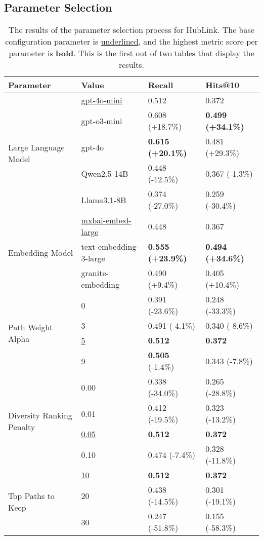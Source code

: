 \subsection{Parameter Selection}

\begin{table}[t]
    \centering
    \begin{tabular}{llll}
        \toprule
        \textbf{Parameter} & \textbf{Value} & \textbf{Recall} & \textbf{Hits@10} \\
        \midrule
        \multirow{5}{*}{Large Language Model} 
            & \underline{gpt-4o-mini} & 0.512 & 0.372 \\
            & gpt-o3-mini & 0.608 (+18.7\%) & \textbf{0.499 (+34.1\%)} \\
            & gpt-4o & \textbf{0.615 (+20.1\%)} & 0.481 (+29.3\%) \\
            & Qwen2.5-14B & 0.448 (-12.5\%) & 0.367 (-1.3\%) \\
            & Llama3.1-8B & 0.374 (-27.0\%) & 0.259 (-30.4\%) \\
        \midrule
        \multirow{3}{*}{Embedding Model}
            & \underline{mxbai-embed-large} & 0.448 & 0.367 \\
            & text-embedding-3-large & \textbf{0.555 (+23.9\%)} & \textbf{0.494 (+34.6\%)} \\
            & granite-embedding & 0.490 (+9.4\%) & 0.405 (+10.4\%) \\
        \midrule
        \multirow{4}{*}{Path Weight Alpha}
            & 0 & 0.391 (-23.6\%) & 0.248 (-33.3\%) \\
            & 3 & 0.491 (-4.1\%) & 0.340 (-8.6\%) \\
            & \underline{5} & \textbf{0.512} & \textbf{0.372} \\
            & 9 & \textbf{0.505} (-1.4\%) & 0.343 (-7.8\%) \\
        \midrule
        \multirow{4}{*}{Diversity Ranking Penalty}
            & 0.00 & 0.338 (-34.0\%) & 0.265 (-28.8\%) \\
            & 0.01 & 0.412 (-19.5\%) & 0.323 (-13.2\%) \\
            & \underline{0.05} & \textbf{0.512} & \textbf{0.372} \\
            & 0.10 & 0.474 (-7.4\%) & 0.328 (-11.8\%) \\
        \midrule
        \multirow{3}{*}{Top Paths to Keep}
            & \underline{10} & \textbf{0.512} & \textbf{0.372} \\
            & 20 & 0.438 (-14.5\%) & 0.301 (-19.1\%) \\
            & 30 & 0.247 (-51.8\%) & 0.155 (-58.3\%) \\
        \bottomrule
    \end{tabular}
    \caption[Results of the Parameter Selection Process for HubLink Part 1]{The results of the parameter selection process for HubLink. The base configuration parameter is \underline{underlined}, and the highest metric score per parameter is \textbf{bold}. This is the first out of two tables that display the results.}
    \label{tab:hublink_parameter_selection_part_1}
\end{table}


